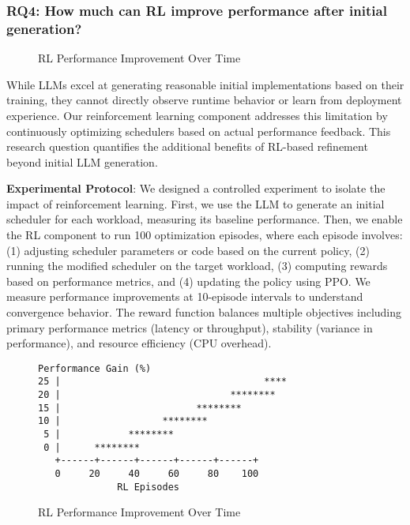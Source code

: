 \subsubsection{RQ4: How much can RL improve performance after initial generation?}

\begin{figure}[h]
\centering
{}
\caption{RL Performance Improvement Over Time}
\label{fig:rl-improvement}
\end{figure}

While LLMs excel at generating reasonable initial implementations based on their training, they cannot directly observe runtime behavior or learn from deployment experience. Our reinforcement learning component addresses this limitation by continuously optimizing schedulers based on actual performance feedback. This research question quantifies the additional benefits of RL-based refinement beyond initial LLM generation.

\textbf{Experimental Protocol}: We designed a controlled experiment to isolate the impact of reinforcement learning. First, we use the LLM to generate an initial scheduler for each workload, measuring its baseline performance. Then, we enable the RL component to run 100 optimization episodes, where each episode involves: (1) adjusting scheduler parameters or code based on the current policy, (2) running the modified scheduler on the target workload, (3) computing rewards based on performance metrics, and (4) updating the policy using PPO. We measure performance improvements at 10-episode intervals to understand convergence behavior. The reward function balances multiple objectives including primary performance metrics (latency or throughput), stability (variance in performance), and resource efficiency (CPU overhead).

\begin{figure}[h]
\centering
\caption{RL Performance Improvement Over Time}
\label{fig:rl-improvement}
\begin{verbatim}
Performance Gain (%)
25 |                                    ****
20 |                              ********
15 |                        ********
10 |                  ********
 5 |            ********
 0 |      ********
   +------+------+------+------+------+
   0     20     40     60     80    100
              RL Episodes
\end{verbatim}
\end{figure}

